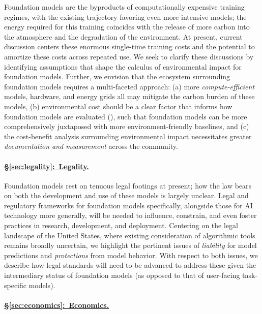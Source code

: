 Foundation models are the byproducts of computationally expensive training regimes, with the existing trajectory favoring even more intensive models; the energy required for this training coincides with the release of more carbon into the atmosphere and the degradation of the environment.
At present, current discussion centers these enormous single-time training costs and the potential to amortize these costs across repeated use.
We seek to clarify these discussions by identifying assumptions that shape the calculus of environmental impact for foundation models.
Further, we envision that the ecosystem surrounding foundation models requires a multi-faceted approach: (a) more \textit{compute-efficient} models, hardware, and energy grids all may mitigate the carbon burden of these models, (b) environmental cost should be a clear factor that informs how foundation models are evaluated (), such that foundation models can be more comprehensively juxtaposed with more environment-friendly baselines, and (c) the cost-benefit analysis surrounding environmental impact necessitates greater \textit{documentation and measurement} across the community.

\paragraph{\hyperref[sec:legality]{§\ref{sec:legality}:~Legality.}}

Foundation models rest on tenuous legal footings at present; how the law bears on both the development and use of these models is largely unclear.
Legal and regulatory frameworks for foundation models specifically, alongside those for AI technology more generally, will be needed to influence, constrain, and even foster practices in research, development, and deployment.
Centering on the legal landscape of the United States, where existing consideration of algorithmic tools remains broadly uncertain, we highlight the pertinent issues of \textit{liability} for model predictions and \textit{protections} from model behavior.
With respect to both issues, we describe how legal standards will need to be advanced to address these given the intermediary status of foundation models (as opposed to that of user-facing task-specific models). 

\paragraph{\hyperref[sec:economics]{§\ref{sec:economics}:~Economics.}}

